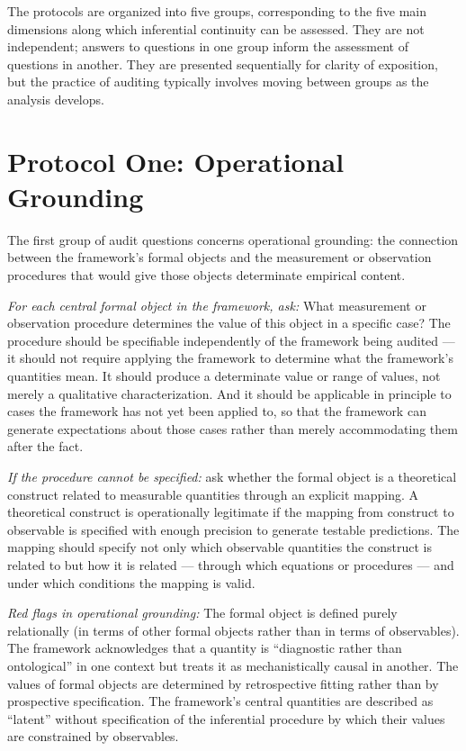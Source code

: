 \documentclass[12pt, openright, twoside]{book}
\begin{document}
The protocols are organized into five groups, corresponding to the five
main dimensions along which inferential continuity can be assessed. They
are not independent; answers to questions in one group inform the assessment
of questions in another. They are presented sequentially for clarity of
exposition, but the practice of auditing typically involves moving between
groups as the analysis develops.

\section{Protocol One: Operational Grounding}

The first group of audit questions concerns operational grounding: the
connection between the framework's formal objects and the measurement or
observation procedures that would give those objects determinate empirical
content.

\textit{For each central formal object in the framework, ask:} What
measurement or observation procedure determines the value of this object
in a specific case? The procedure should be specifiable independently
of the framework being audited --- it should not require applying the
framework to determine what the framework's quantities mean. It should
produce a determinate value or range of values, not merely a qualitative
characterization. And it should be applicable in principle to cases the
framework has not yet been applied to, so that the framework can generate
expectations about those cases rather than merely accommodating them after
the fact.

\textit{If the procedure cannot be specified:} ask whether the formal object
is a theoretical construct related to measurable quantities through an explicit
mapping. A theoretical construct is operationally legitimate if the mapping
from construct to observable is specified with enough precision to generate
testable predictions. The mapping should specify not only which observable
quantities the construct is related to but how it is related --- through
which equations or procedures --- and under which conditions the mapping
is valid.

\textit{Red flags in operational grounding:} The formal object is defined
purely relationally (in terms of other formal objects rather than in terms
of observables). The framework acknowledges that a quantity is ``diagnostic
rather than ontological'' in one context but treats it as mechanistically
causal in another. The values of formal objects are determined by
retrospective fitting rather than by prospective specification. The framework's
central quantities are described as ``latent'' without specification of the
inferential procedure by which their values are constrained by observables.
\end{document}
